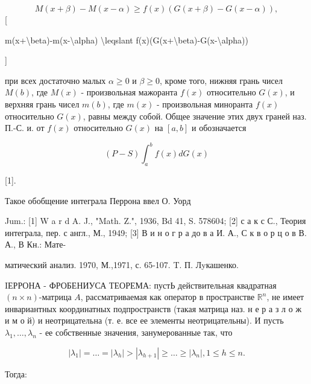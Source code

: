 \documentclass[10pt]{article}
\begin{document}
\[

M(x+\beta)-M(x-\alpha) \geqslant f(x)(G(x+\beta)-G(x-\alpha)),

\][



m(x+\textbackslash beta)-m(x-\textbackslash alpha) \textbackslash leqslant f(x)(G(x+\textbackslash beta)-G(x-\textbackslash alpha))

]



при всех достаточно малых $\alpha \geqslant 0$ и $\beta \geqslant 0$, кроме того, нижняя грань чисел $M(b)$, где $M(x)$ - произвольная мажоранта $f(x)$ относительно $G(x)$, и верхняя грань чисел $m(b)$, где $m(x)$ - произвольная миноранта $f(x)$ относительно $G(x)$, равны между собой. Общее значение этих двух граней наз. П.-С. и. от $f(x)$ относительно $G(x)$ на $[a, b]$ и обозначается



\[

(P-S) \int_{a}^{b} f(x) d G(x)

\]



[1].



Такое обобщение интеграла Перрона ввел О. Уорд



Jum.: [1] W a r d A. J., "Math. Z.", 1936, Bd 41, S. 578604; [2] с а к с С., Теория интеграла, пер. с англ., М., 1949; [3] В и н о г р а до в а И. А., С к в о р ц о в В. А., В Кн.: Мате-

матический анализ. 1970, М.,1971, с. 65-107. T. П. Лyкашенко.



IЕРРОНА - ФРОБЕНИУСА ТЕОРЕМА: пустЬ действительная квадратная $(n \times n)$-матрица $A$, рассматриваемая как оператор в пространстве $\mathbb{R}^{n}$, не имеет инвариантных координатных подпространств (такая матрица наз. н е р а з л о ж и м о й) и неотрицательна (т. е. все ее элементы неотрицательны). И пусть $\lambda_{1}, \ldots, \lambda_{n}$ - ее собственные значения, занумерованные так, что



\[

\left|\lambda_{1}\right|=\ldots=\left|\lambda_{h}\right|>\left|\lambda_{h+1}\right| \geqslant \ldots \geqslant\left|\lambda_{n}\right|, 1 \leqslant h \leqslant n .

\]



Тогда:
\end{document}
